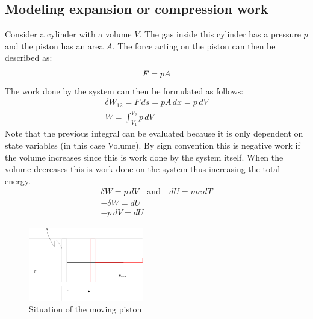 \documentclass[11pt, a4paper]{article}
\begin{document}
\subsection{Modeling expansion or compression work}
Consider a cylinder with a volume $V$. The gas inside this cylinder has a pressure $p$ and the piston has an area $A$. The force acting on the piston can then be described as:
\begin{equation}
  F = pA\\
\end{equation}
The work done by the system can then be formulated as follows:
\begin{gather}
  \delta W_{12} = F\,ds = pA\,dx = p\,dV\\
  W = \int_{V_1}^{V_2} p\,dV
\end{gather}
Note that the previous integral can be evaluated because it is only dependent on state variables (in this case Volume). By sign convention this is negative work if the volume increases since this is work done by the system itself. When the volume decreases this is work done on the system thus increasing the total energy. 
\begin{gather}
  \delta W = p\,dV \quad \text{and} \quad dU = mc\,dT\\
  -\delta W = dU\\
  -p\,dV = dU
\end{gather}
\begin{figure}[h!]
  \centerline{\includegraphics[width=50mm]{images/Work Done.png}}
  \caption{Situation of the moving piston}
\end{figure}
\end{document}

